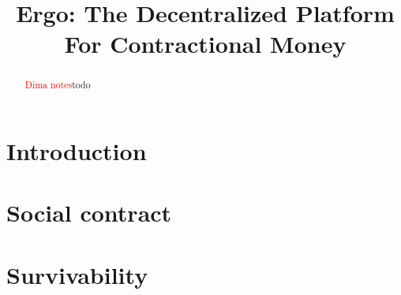 \documentclass[]{article}
\newcommand{\dnote}[1]{{\textcolor{red}{Dima notes}}{#1}}
\begin{document}
    \title{Ergo: The Decentralized Platform For Contractional Money}


    \maketitle

    \begin{abstract}
        \dnote{todo}
    \end{abstract}



    \section{Introduction}


    \section{Social contract}



    \section{Survivability}
\end{document}
